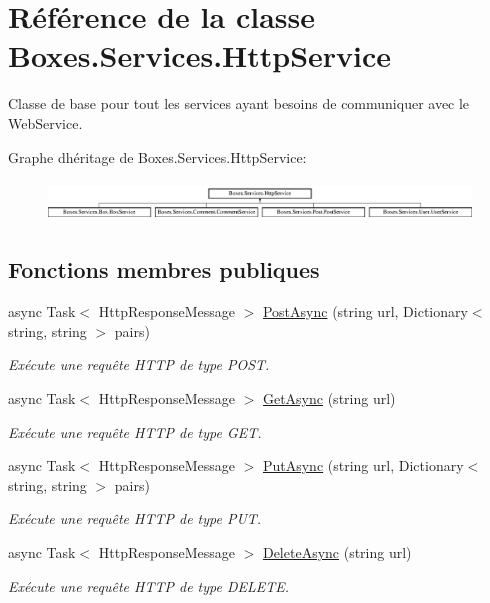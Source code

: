 \hypertarget{class_boxes_1_1_services_1_1_http_service}{}\section{Référence de la classe Boxes.\+Services.\+Http\+Service}
\label{class_boxes_1_1_services_1_1_http_service}


Classe de base pour tout les services ayant besoins de communiquer avec le Web\+Service.  


Graphe d\textquotesingle{}héritage de Boxes.\+Services.\+Http\+Service\+:\begin{figure}[H]
\begin{center}
\leavevmode
\includegraphics[height=1.068702cm]{class_boxes_1_1_services_1_1_http_service}
\end{center}
\end{figure}
\subsection*{Fonctions membres publiques}
\begin{DoxyCompactItemize}
\item 
async Task$<$ Http\+Response\+Message $>$ \hyperlink{class_boxes_1_1_services_1_1_http_service_a2cab0d00215bd550dfa0800dc76a72c5}{Post\+Async} (string url, Dictionary$<$ string, string $>$ pairs)
\begin{DoxyCompactList}\small\item\em Exécute une requête H\+T\+TP de type P\+O\+ST. \end{DoxyCompactList}\item 
async Task$<$ Http\+Response\+Message $>$ \hyperlink{class_boxes_1_1_services_1_1_http_service_aaffa530898c661e176158c89c288655f}{Get\+Async} (string url)
\begin{DoxyCompactList}\small\item\em Exécute une requête H\+T\+TP de type G\+ET. \end{DoxyCompactList}\item 
async Task$<$ Http\+Response\+Message $>$ \hyperlink{class_boxes_1_1_services_1_1_http_service_a1351153d159242142dff860106115010}{Put\+Async} (string url, Dictionary$<$ string, string $>$ pairs)
\begin{DoxyCompactList}\small\item\em Exécute une requête H\+T\+TP de type P\+UT. \end{DoxyCompactList}\item 
async Task$<$ Http\+Response\+Message $>$ \hyperlink{class_boxes_1_1_services_1_1_http_service_ac710b86113bdd643909d124f6cd10637}{Delete\+Async} (string url)
\begin{DoxyCompactList}\small\item\em Exécute une requête H\+T\+TP de type D\+E\+L\+E\+TE. \end{DoxyCompactList}\end{DoxyCompactItemize}

